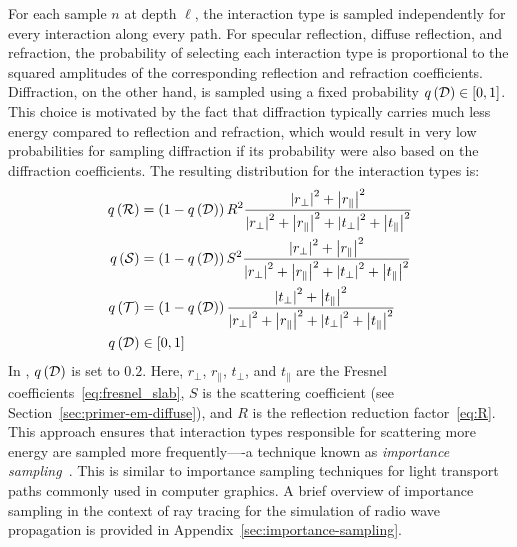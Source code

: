 For each sample $n$ at depth $\ell$, the interaction type is sampled independently for every interaction along every path.
For specular reflection, diffuse reflection, and refraction, the probability of selecting each interaction type is proportional to the squared amplitudes of the corresponding reflection and refraction coefficients.
Diffraction, on the other hand, is sampled using a fixed probability $q\left({\cal D}\right) \in [0, 1]$.
This choice is motivated by the fact that diffraction typically carries much less energy compared to reflection and refraction, which would result in very low probabilities for sampling diffraction if its probability were also based on the diffraction coefficients.
The resulting distribution for the interaction types is:
\begin{equation}
    \label{eq:path-solver-used-dist-event}
    \begin{aligned}
        q\left({\cal R}\right) &= \left(1 - q\left({\cal D}\right)\right)R^2\frac{\left| r_{\perp} \right|^2 + \left| r_{\parallel} \right|^2}{\left| r_{\perp} \right|^2 + \left| r_{\parallel} \right|^2 + \left| t_{\perp} \right|^2 + \left| t_{\parallel} \right|^2}\\
        q\left({\cal S}\right) &= \left(1 - q\left({\cal D}\right)\right)S^2\frac{\left| r_{\perp} \right|^2 + \left| r_{\parallel} \right|^2}{\left| r_{\perp} \right|^2 + \left| r_{\parallel} \right|^2 + \left| t_{\perp} \right|^2 + \left| t_{\parallel} \right|^2}\\
        q\left({\cal T}\right) &= \left(1 - q\left({\cal D}\right)\right)\frac{\left| t_{\perp} \right|^2 + \left| t_{\parallel} \right|^2}{\left| r_{\perp} \right|^2 + \left| r_{\parallel} \right|^2 + \left| t_{\perp} \right|^2 + \left| t_{\parallel} \right|^2}\\
        q\left({\cal D}\right) &\in [0, 1]
    \end{aligned}
\end{equation}
In \SRT{}, $q\left( {\cal D} \right)$ is set to $0.2$.
Here, $r_{\perp}$, $r_{\parallel}$, $t_{\perp}$, and $t_{\parallel}$ are the Fresnel coefficients~\eqref{eq:fresnel_slab}, $S$ is the scattering coefficient (see Section~\ref{sec:primer-em-diffuse}), and $R$ is the reflection reduction factor~\eqref{eq:R}. This approach ensures that interaction types responsible for scattering more energy are sampled more frequently—-a technique known as \emph{importance sampling}~\cite{Kloek1978, Wikipedia_Importance_Sampling}.
This is similar to importance sampling techniques for light transport paths commonly used in computer graphics.
A brief overview of importance sampling in the context of ray tracing for the simulation of radio wave propagation is provided in Appendix~\ref{sec:importance-sampling}.

